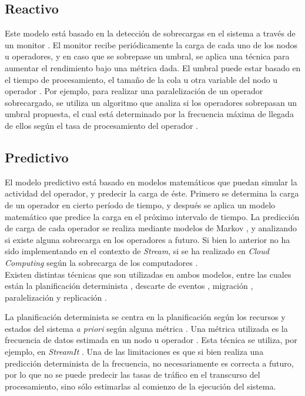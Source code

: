 \subsection{Reactivo}

Este modelo está basado en la detección de sobrecargas en el sistema a través de un monitor \citep{GulisanoJPSV12}. El monitor recibe periódicamente la carga de cada uno de los nodos u operadores, y en caso que se sobrepase un umbral, se aplica una técnica para aumentar el rendimiento bajo una métrica dada. El umbral puede estar basado en el tiempo de procesamiento, el tamaño de la cola u otra variable del nodo u operador \citep{BhuvanagiriGKS06}. Por ejemplo, para realizar una paralelización de un operador sobrecargado, se utiliza un algoritmo que analiza si los operadores sobrepasan un umbral propuesta, el cual está determinado por la frecuencia máxima de llegada de ellos según el tasa de procesamiento del operador \citep{SchneiderAGBW09}.

\subsection{Predictivo}
El modelo predictivo está basado en modelos matemáticos que puedan simular la actividad del operador, y predecir la carga de éste. Primero se determina la carga de un operador en cierto período de tiempo, y después se aplica un modelo matemático que predice la carga en el próximo intervalo de tiempo. La predicción de carga de cada operador se realiza mediante modelos de Markov \citep{GongGW10}, y analizando si existe alguna sobrecarga en los operadores a futuro. Si bien lo anterior no ha sido implementando en el contexto de \textsl{Stream}, si se ha realizado en \textsl{Cloud Computing} según la sobrecarga de los computadores \citep{NguyenSGSW13}.\\

Existen distintas técnicas que son utilizadas en ambos modelos, entre las cuales están la planificación determinista \citep{XuCTS14, DongTS07}, descarte de eventos \citep{SheuC09}, migración \citep{XingZH05}, para\-lelización \citep{GulisanoJPSV12, IshiiS11, GedikSHW14} y replicación \citep{FernandezMKP13}.

La planificación determinista \citep{DongTS07} se centra en la planificación según los recursos y estados del sistema \textsl{a priori} según alguna métrica \citep{XuCTS14}. Una métrica utilizada es la frecuencia de datos estimada en un nodo u operador \citep{Ganguly09}. Esta técnica se utiliza, por ejemplo, en \textsl{StreamIt} \citep{ThiesKA02}. Una de las limitaciones es que si bien realiza una predicción determinista de la frecuencia, no necesariamente es correcta a futuro, por lo que no se puede predecir las tasas de tráfico en el transcurso del procesamiento, sino sólo estimarlas al comienzo de la ejecución del sistema.

